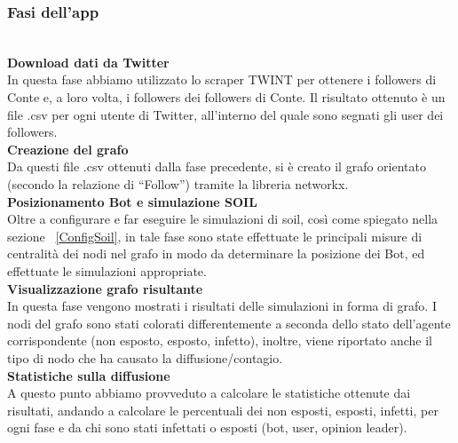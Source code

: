         \subsubsection{Fasi dell'app}
          \\
          \textbf{Download dati da Twitter}
          \\
          In questa fase abbiamo utilizzato lo scraper TWINT per ottenere i followers di Conte e, a loro volta, i followers dei followers di Conte. Il risultato ottenuto è un file .csv per ogni utente di Twitter, all'interno del quale sono segnati gli user dei followers.
          \\
          \textbf{Creazione del grafo}
          \\
          Da questi file .csv ottenuti dalla fase precedente, si è creato il grafo orientato (secondo la relazione di “Follow”) tramite la libreria networkx.
          \\
          \textbf{Posizionamento Bot e simulazione SOIL}
          \\
          Oltre a configurare e far eseguire le simulazioni di soil, così come spiegato nella sezione ~\ref{ConfigSoil}, in tale fase sono state effettuate le principali misure di centralità dei nodi nel grafo in modo da determinare la posizione dei Bot, ed effettuate le simulazioni appropriate.
          \\
          \textbf{Visualizzazione grafo risultante}
          \\
          In questa fase vengono mostrati i risultati delle simulazioni in forma di grafo. I nodi del grafo sono stati colorati differentemente a seconda dello stato dell’agente corrispondente (non esposto, esposto, infetto), inoltre, viene riportato anche il tipo di nodo che ha causato la diffusione/contagio.
          \\
          \textbf{Statistiche sulla diffusione}
          \\
          A questo punto abbiamo provveduto a calcolare le statistiche ottenute dai risultati, andando a calcolare le percentuali dei non esposti, esposti, infetti, per ogni fase e da chi sono stati infettati o esposti (bot, user, opinion leader).
